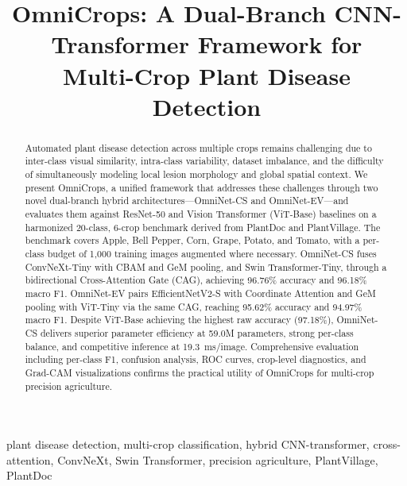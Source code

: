 \documentclass[conference]{IEEEtran}
\begin{document}
\title{OmniCrops: A Dual-Branch CNN-Transformer Framework for\\Multi-Crop Plant Disease Detection}

\author{
}

\maketitle

\begin{abstract}
Automated plant disease detection across multiple crops remains challenging due to inter-class visual similarity, intra-class variability, dataset imbalance, and the difficulty of simultaneously modeling local lesion morphology and global spatial context. We present OmniCrops, a unified framework that addresses these challenges through two novel dual-branch hybrid architectures—OmniNet-CS and OmniNet-EV—and evaluates them against ResNet-50 and Vision Transformer (ViT-Base) baselines on a harmonized 20-class, 6-crop benchmark derived from PlantDoc and PlantVillage. The benchmark covers Apple, Bell Pepper, Corn, Grape, Potato, and Tomato, with a per-class budget of 1{,}000 training images augmented where necessary. OmniNet-CS fuses ConvNeXt-Tiny with CBAM and GeM pooling, and Swin Transformer-Tiny, through a bidirectional Cross-Attention Gate (CAG), achieving 96.76\% accuracy and 96.18\% macro F1. OmniNet-EV pairs EfficientNetV2-S with Coordinate Attention and GeM pooling with ViT-Tiny via the same CAG, reaching 95.62\% accuracy and 94.97\% macro F1. Despite ViT-Base achieving the highest raw accuracy (97.18\%), OmniNet-CS delivers superior parameter efficiency at 59.0M parameters, strong per-class balance, and competitive inference at 19.3~ms/image. Comprehensive evaluation including per-class F1, confusion analysis, ROC curves, crop-level diagnostics, and Grad-CAM visualizations confirms the practical utility of OmniCrops for multi-crop precision agriculture.
\end{abstract}

\begin{IEEEkeywords}
plant disease detection, multi-crop classification, hybrid CNN-transformer, cross-attention, ConvNeXt, Swin Transformer, precision agriculture, PlantVillage, PlantDoc
\end{IEEEkeywords}
\end{document}
